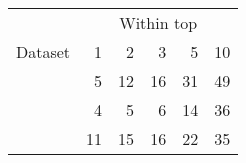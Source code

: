 \begin{tabular}{lrrrrr}\toprule
& \multicolumn{5}{c}{Within top} \\
\cmidrule{2-6}
Dataset & 1 & 2 & 3 & 5 & 10 \\
\midrule
\fanasym{} & 5 & 12 & 16 & 31 & 49 \\
\fansym{} & 4 & 5 & 6 & 14 & 36 \\
\ngsym{} & 11 & 15 & 16 & 22 & 35 \\
\bottomrule
\end{tabular}
